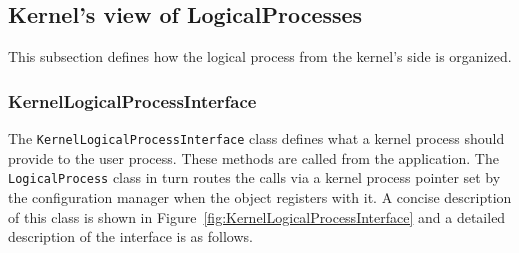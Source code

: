 \subsection{Kernel's view of LogicalProcesses}

This subsection defines how the logical process from the kernel's side is
organized.

\subsubsection{KernelLogicalProcessInterface}

The {\tt KernelLogicalProcessInterface} class defines what a kernel
process should provide to the user process. These methods are called from
the application. The {\tt LogicalProcess} class in turn routes the calls
via a kernel process pointer set by the configuration manager when the
object registers with it. A concise description of this class is shown in
Figure~\ref{fig:KernelLogicalProcessInterface} and a detailed description
of the interface is as follows.

\begin{figure*}
\begin{center}
\ 
\end{center}
\caption{The interface kernel should provide to the user
  process.}\label{fig:KernelLogicalProcessInterface}
\end{figure*}

